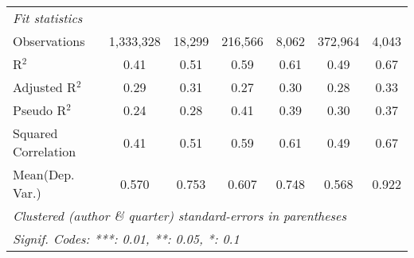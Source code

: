 \begin{tabular}{lcccccc}
   \midrule
   \emph{Fit statistics}\\
   Observations                                               & 1,333,328      & 18,299       & 216,566        & 8,062   & 372,964        & 4,043\\  
   R$^2$                                                      & 0.41           & 0.51         & 0.59           & 0.61    & 0.49           & 0.67\\  
   Adjusted R$^2$                                             & 0.29           & 0.31         & 0.27           & 0.30    & 0.28           & 0.33\\  
   Pseudo R$^2$                                               & 0.24           & 0.28         & 0.41           & 0.39    & 0.30           & 0.37\\  
   Squared Correlation                                        & 0.41           & 0.51         & 0.59           & 0.61    & 0.49           & 0.67\\  
Mean(Dep. Var.) & 0.570 & 0.753 & 0.607 & 0.748 & 0.568 & 0.922 \\
   \midrule \midrule
   \multicolumn{7}{l}{\emph{Clustered (author \& quarter) standard-errors in parentheses}}\\
   \multicolumn{7}{l}{\emph{Signif. Codes: ***: 0.01, **: 0.05, *: 0.1}}\\
\end{tabular}
\par\endgroup
